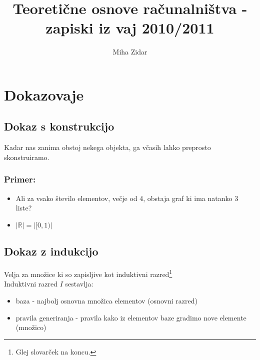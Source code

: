 \documentclass[10pt,a4paper]{article}
\author{Miha Zidar}
\title{Teoretične osnove računalništva - zapiski iz vaj 2010/2011}
\begin{document}
\maketitle
\newpage
\tableofcontents


\newpage
\section{Dokazovaje}
\subsection{Dokaz s konstrukcijo}
	Kadar nas zanima obstoj nekega objekta, ga včasih lahko preprosto skonstruiramo.\\
	\subsubsection*{Primer:}
	\begin{itemize}
		\item Ali za vsako število elementov, večje od 4, obstaja graf ki ima natanko 3 liste?
		\item $| \mathbb{R} | = | [0,1) |$
	\end{itemize}
	
\subsection{Dokaz z indukcijo}
	Velja za množice ki so zapisljive kot induktivni razred\footnote{Glej slovarček na koncu.}\\
	Induktivni razred $I$ sestavlja:
	\begin{itemize}
		\item baza - najbolj osnovna množica elementov (osnovni razred)
		\item pravila generiranja - pravila kako iz elementov baze gradimo nove elemente (množico)
		\end{itemize}
\end{document}
